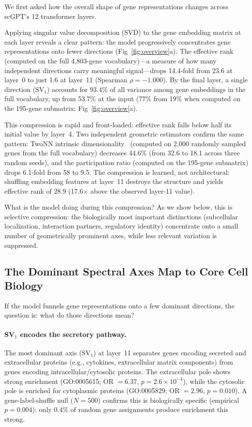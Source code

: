 \documentclass[12pt]{article}
\newcommand{\SV}[1]{\mathrm{SV}_{#1}}
\begin{document}
We first asked how the overall shape of gene representations changes across scGPT's 12 transformer layers.

Applying singular value decomposition (SVD) to the gene embedding matrix at each layer reveals a clear pattern: the model progressively concentrates gene representations onto fewer directions (Fig~\ref{fig:overview}a).
The effective rank (computed on the full 4{,}803-gene vocabulary)---a measure of how many independent directions carry meaningful signal---drops 14.4-fold from 23.6 at layer~0 to just 1.6 at layer~11 (Spearman $\rho = -1.000$).
By the final layer, a single direction ($\SV{1}$) accounts for 93.4\% of all variance among gene embeddings in the full vocabulary, up from 53.7\% at the input (77\% from 19\% when computed on the 195-gene submatrix; Fig~\ref{fig:overview}a).

This compression is rapid and front-loaded: effective rank falls below half its initial value by layer~4.
Two independent geometric estimators confirm the same pattern: TwoNN intrinsic dimensionality~\cite{facco2017estimating} (computed on 2{,}000 randomly sampled genes from the full vocabulary) decreases 44.6\% (from 32.6 to 18.1 across three random seeds), and the participation ratio (computed on the 195-gene submatrix) drops 6.1-fold from 58 to 9.5.
The compression is learned, not architectural: shuffling embedding features at layer~11 destroys the structure and yields effective rank of 28.9 (17.6$\times$ above the observed layer-11 value).

What is the model doing during this compression?
As we show below, this is selective compression: the biologically most important distinctions (subcellular localization, interaction partners, regulatory identity) concentrate onto a small number of geometrically prominent axes, while less relevant variation is suppressed.

\subsection{The Dominant Spectral Axes Map to Core Cell Biology}
\label{sec:bio_axes}

If the model funnels gene representations onto a few dominant directions, the question is: what do those directions mean?

\paragraph{SV$_1$ encodes the secretory pathway.}
The most dominant axis ($\SV{1}$) at layer~11 separates genes encoding secreted and extracellular proteins (e.g., cytokines, extracellular matrix components) from genes encoding intracellular/cytosolic proteins.
The extracellular pole shows strong enrichment (GO:0005615; OR $= 6.37$, $p = 2.6 \times 10^{-4}$), while the cytosolic pole is enriched for cytoplasmic proteins (GO:0005829; OR $= 2.96$, $p = 0.010$).
A gene-label-shuffle null ($N = 500$) confirms this is biologically specific (empirical $p = 0.004$): only 0.4\% of random gene assignments produce enrichment this strong.
\end{document}
